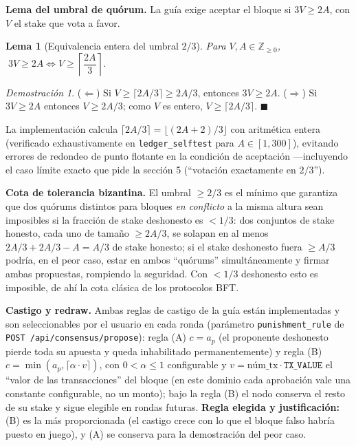 \documentclass[11pt]{article}
\newtheorem{lemma}{Lema}
\theoremstyle{remark}
\newtheorem*{proof*}{Demostración}
\begin{document}
\textbf{Lema del umbral de quórum.} La guía exige aceptar el bloque si $3V\ge 2A$, con $V$ el stake que vota a favor.

\begin{lemma}[Equivalencia entera del umbral $2/3$]
Para $V,A\in\mathbb{Z}_{\ge0}$, $\;3V\ge 2A \iff V\ge\left\lceil \dfrac{2A}{3}\right\rceil$.
\end{lemma}
\begin{proof*}
($\Leftarrow$) Si $V\ge\lceil 2A/3\rceil\ge 2A/3$, entonces $3V\ge 2A$.
($\Rightarrow$) Si $3V\ge 2A$ entonces $V\ge 2A/3$; como $V$ es entero, $V\ge\lceil 2A/3\rceil$. $\blacksquare$
\end{proof*}
La implementación calcula $\lceil 2A/3\rceil = \lfloor (2A+2)/3\rfloor$ con aritmética entera (verificado exhaustivamente en
\texttt{ledger\_selftest} para $A\in[1,300]$), evitando errores de redondeo de punto flotante en la condición de aceptación
—incluyendo el caso límite exacto que pide la sección 5 (``votación exactamente en $2/3$'').

\textbf{Cota de tolerancia bizantina.} El umbral $\ge 2/3$ es el mínimo que garantiza que dos quórums distintos para bloques
\emph{en conflicto} a la misma altura sean imposibles si la fracción de stake deshonesto es $<1/3$: dos conjuntos de stake
honesto, cada uno de tamaño $\ge 2A/3$, se solapan en al menos $2A/3+2A/3-A=A/3$ de stake honesto; si el stake deshonesto
fuera $\ge A/3$ podría, en el peor caso, estar en ambos ``quórums'' simultáneamente y firmar ambas propuestas, rompiendo la
seguridad. Con $<1/3$ deshonesto esto es imposible, de ahí la cota clásica de los protocolos BFT.

\textbf{Castigo y redraw.} Ambas reglas de castigo de la guía están implementadas y son seleccionables por el usuario en
cada ronda (parámetro \texttt{punishment\_rule} de \texttt{POST /api/consensus/propose}): regla (A) $c=a_p$ (el proponente
deshonesto pierde toda su apuesta y queda inhabilitado permanentemente) y regla (B) $c=\min(a_p,\lceil\alpha\cdot v\rceil)$,
con $0<\alpha\le1$ configurable y $v=\text{núm\_tx}\cdot\texttt{TX\_VALUE}$ el ``valor de las transacciones'' del bloque
(en este dominio cada aprobación vale una constante configurable, no un monto); bajo la regla (B) el nodo conserva el resto de
su stake y sigue elegible en rondas futuras. \textbf{Regla elegida y justificación:} (B) es la más proporcionada (el castigo
crece con lo que el bloque falso habría puesto en juego), y (A) se conserva para la demostración del peor caso.
\end{document}
